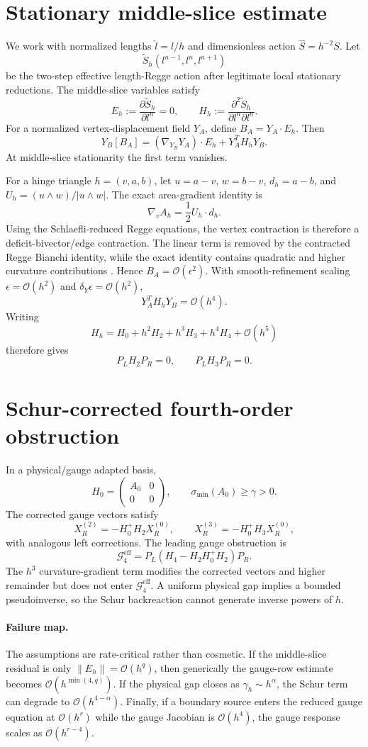 \documentclass[11pt]{article}
\newcommand{\Oh}{\mathcal{O}}
\newcommand{\Gfour}{\mathcal{G}^{\mathrm{eff}}_4}
\newcommand{\PL}{P_L}
\newcommand{\PR}{P_R}
\begin{document}
\section{Stationary middle-slice estimate}
We work with normalized lengths $\hat l=l/h$ and dimensionless action $\widehat S=h^{-2}S$. Let
\[
\widetilde S_h(l^{n-1},l^n,l^{n+1})
\]
be the two-step effective length-Regge action after legitimate local stationary reductions. The middle-slice variables satisfy
\[
E_h:=\frac{\partial\widetilde S_h}{\partial l^n}=0,
\qquad
H_h:=\frac{\partial^2\widetilde S_h}{\partial l^n\partial l^n}.
\]
For a normalized vertex-displacement field $Y_A$, define $B_A=Y_A\cdot E_h$. Then
\[
Y_B[B_A]=(\nabla_{Y_B}Y_A)\cdot E_h+Y_A^TH_hY_B.
\]
At middle-slice stationarity the first term vanishes.

For a hinge triangle $h=(v,a,b)$, let $u=a-v$, $w=b-v$, $d_h=a-b$, and $U_h=(u\wedge w)/|u\wedge w|$. The exact area-gradient identity is
\[
\nabla_vA_h=\frac12 U_h\cdot d_h.
\]
Using the Schlaefli-reduced Regge equations, the vertex contraction is therefore a deficit-bivector/edge contraction. The linear term is removed by the contracted Regge Bianchi identity, while the exact identity contains quadratic and higher curvature contributions \cite{HamberKagel2004,GentleEtAl2009,Williams2012}. Hence $B_A=\Oh(\epsilon^2)$. With smooth-refinement scaling $\epsilon=\Oh(h^2)$ and $\delta_Y\epsilon=\Oh(h^2)$,
\[
Y_A^TH_hY_B=\Oh(h^4).
\]
Writing
\[
H_h=H_0+h^2H_2+h^3H_3+h^4H_4+\Oh(h^5)
\]
therefore gives
\[
\PL H_2\PR=0,\qquad \PL H_3\PR=0.
\]

\section{Schur-corrected fourth-order obstruction}
In a physical/gauge adapted basis,
\[
H_0=\begin{pmatrix}A_0&0\\0&0\end{pmatrix},
\qquad \sigma_{\min}(A_0)\ge\gamma>0.
\]
The corrected gauge vectors satisfy
\[
X_R^{(2)}=-H_0^+H_2X_R^{(0)},\qquad
X_R^{(3)}=-H_0^+H_3X_R^{(0)},
\]
with analogous left corrections. The leading gauge obstruction is
\[
\boxed{\Gfour=\PL(H_4-H_2H_0^+H_2)\PR.}
\]
The $h^3$ curvature-gradient term modifies the corrected vectors and higher remainder but does not enter $\Gfour$. A uniform physical gap implies a bounded pseudoinverse, so the Schur backreaction cannot generate inverse powers of $h$.

\paragraph{Failure map.}
The assumptions are rate-critical rather than cosmetic. If the middle-slice residual is only $\|E_h\|=\Oh(h^q)$, then generically the gauge-row estimate becomes $\Oh(h^{\min(4,q)})$. If the physical gap closes as $\gamma_h\sim h^\alpha$, the Schur term can degrade to $\Oh(h^{4-\alpha})$. Finally, if a boundary source enters the reduced gauge equation at $\Oh(h^r)$ while the gauge Jacobian is $\Oh(h^4)$, the gauge response scales as $\Oh(h^{r-4})$.
\end{document}
